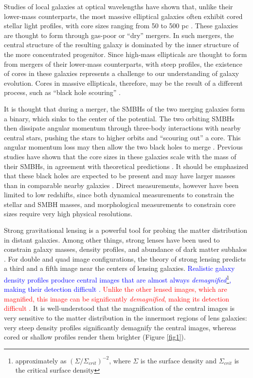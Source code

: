 \documentclass[chicago]{emulateapj}
\newcommand{\blue}{\textcolor{blue}}
\newcommand{\red}{\textcolor{red}}
\begin{document}
Studies of local galaxies at optical wavelengths have shown that, unlike their lower-mass counterparts, the most massive elliptical galaxies often exhibit cored stellar light profiles, with core sizes ranging from 50 to 500 pc \citep[e.g.,][]{Ferrarese:06}. 
These galaxies are thought to form through gas-poor or ``dry'' mergers. In such mergers, the central structure of the resulting galaxy is dominated by the inner structure of the more concentrated progenitor.  Since high-mass ellipticals are thought to form from mergers of their lower-mass counterparts, with steep profiles, the existence of cores in these galaxies represents a challenge to our understanding of galaxy evolution. Cores in massive ellipticals, therefore, may be the result of a different process, such as  
``black hole scouring'' \citep{Thomas:14}.

It is thought that during a merger, the SMBHs of the two merging galaxies form a binary, which sinks to the center of the potential. The two orbiting SMBHs then dissipate angular momentum through three-body interactions with nearby central stars, pushing the stars to higher orbits and ``scouring out'' a core. This angular momentum loss may then allow the two black holes to merge \citep{Begelman:80}.
Previous studies have shown that the core sizes in these galaxies scale with the mass of their SMBHs, in agreement with theoretical predictions \citep{Kormendy:09,Kormendy:13}. It should be emphasized that these black holes are expected to be present and may have larger masses than in comparable nearby galaxies \citep{Bennert:10}. Direct measurements, however have been limited to low redshifts, since both dynamical measurements to constrain the stellar and SMBH masses, and morphological measurements to constrain core sizes require very high physical resolutions. 


Strong gravitational lensing is a powerful tool for probing the matter distribution in distant galaxies. Among other things, strong lenses have been used to constrain galaxy masses, density profiles, and abundance of dark matter subhalos \citep[e.g.,][]{dalal:02, Gavazzi:07, Bolton:08}. For double and quad image configurations, the theory of strong lensing predicts a third and a fifth image near the centers of lensing galaxies. 
\blue{Realistic galaxy density profiles produce central images that are almost always \emph{demagnified}\footnote{approximately as $(\Sigma/\Sigma_{crit})^{-2}$, where $\Sigma$ is the surface density and $\Sigma_{crit}$ is the critical surface density}, making their detection difficult \citep[e.g.,][]{Jackson:13}.}  
\red{Unlike the other lensed images, which are magnified, this image can be significantly \emph{demagnified}, making its detection difficult \citep[e.g.,][]{Jackson:13}.}  It is well-understood that the magnification of the central images is very sensitive to the matter distribution in the innermost regions of lens galaxies: very steep density profiles significantly demagnify the central images, whereas cored or shallow profiles render them brighter (Figure \ref{fig1}). 
\end{document}
